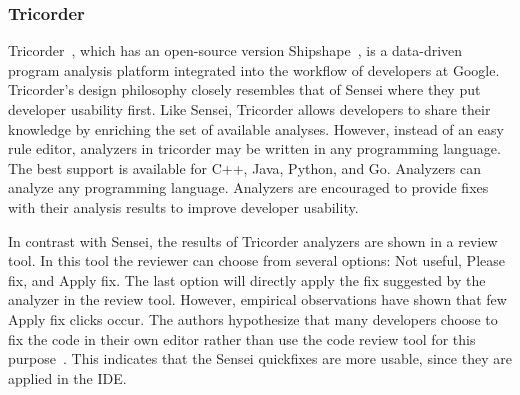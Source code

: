 \subsubsection{Tricorder}
Tricorder~\cite{sadowski2015tricorder}, which has an open-source version Shipshape~\cite{shipshape}, is a data-driven program analysis platform integrated into the workflow of developers at Google. Tricorder's design philosophy closely resembles that of Sensei where they put developer usability first. Like Sensei, Tricorder allows developers to share their knowledge by enriching the set of available analyses. However, instead of an easy rule editor, analyzers in tricorder may be written in any programming language. The best support is available for C++, Java, Python, and Go. Analyzers can analyze any programming language. Analyzers are encouraged to provide fixes with their analysis results to improve developer usability.

In contrast with Sensei, the results of Tricorder analyzers are shown in a review tool. In this tool the reviewer can choose from several options: Not useful, Please fix, and Apply fix. The last option will directly apply the fix suggested by the analyzer in the review tool. However, empirical observations have shown that few Apply fix clicks occur. The authors hypothesize that many developers choose to fix the code in their own editor rather than use the code review tool for this purpose~\cite{sadowski2015tricorder}. This indicates that the Sensei quickfixes are more usable, since they are applied in the IDE. 

